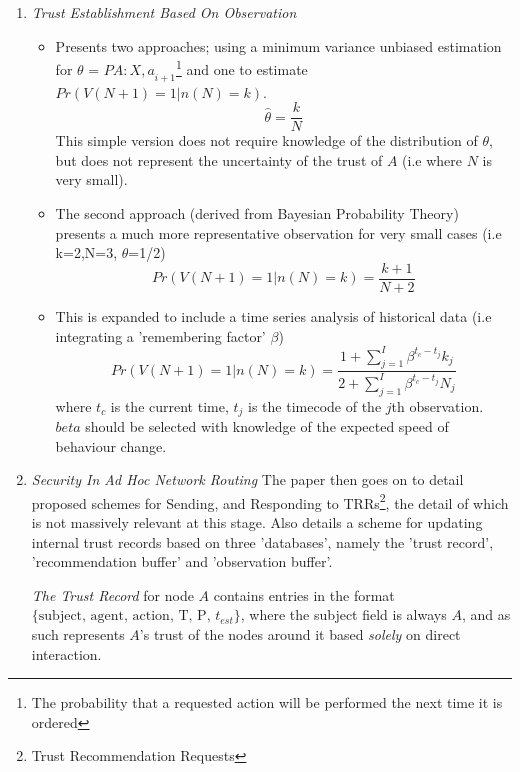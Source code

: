 \begin{itemize}
\begin{enumerate}
      \item \emph{Trust Establishment Based On Observation}
      \begin{itemize}
        \item Presents two approaches; using a minimum variance unbiased estimation for $\theta$ = $P{A:X,a}_{i+1}$\footnote{The probability that a requested action will be performed the next time it is ordered} and one to estimate $Pr(V(N+1)=1|n(N)=k)$. 
        \begin{equation}
          \hat{\theta}=\frac{k}{N}
        \end{equation}
        This simple version does not require knowledge of the distribution of $\theta$, but does not represent the uncertainty of the trust of $A$ (i.e where $N$ is very small).
        \item The second approach (derived from Bayesian Probability Theory) presents a much more representative observation for very small cases (i.e k=2,N=3, $\theta$=1/2)
        \begin{equation}
          Pr(V(N+1)=1|n(N)=k) = \frac{k+1}{N+2}
        \end{equation}
        \item This is expanded to include a time series analysis of historical data (i.e integrating a 'remembering factor' $\beta$) 
        \begin{equation}
          Pr(V(N+1)=1|n(N)=k)=\frac{1+ \sum_{j=1}^I \beta^{t_c-t_j} k_j}{2+ \sum_{j=1}^I \beta^{t_c-t_j} N_j}
        \end{equation}
        where $t_c$ is the current time, $t_j$ is the timecode of the $j$th
        observation. $beta$ should be selected with knowledge of the expected
        speed of behaviour change. 
      \end{itemize}
      \item \emph{Security In Ad Hoc Network Routing}
          The paper then goes on to detail proposed schemes for Sending, and Responding to TRRs\footnote{Trust Recommendation Requests}, the detail of which is not massively relevant at this stage.
          Also details a scheme for updating internal trust records based on three 'databases', namely the 'trust record', 'recommendation buffer' and 'observation buffer'.

          \emph{The Trust Record} for node $A$ contains entries in the format $\{\text{subject, agent, action, T, P, }t_{est}\}$, where the subject field is always $A$, and as such represents $A$'s trust of the nodes around it based \emph{solely} on direct interaction.


\end{enumerate}
\end{itemize}
